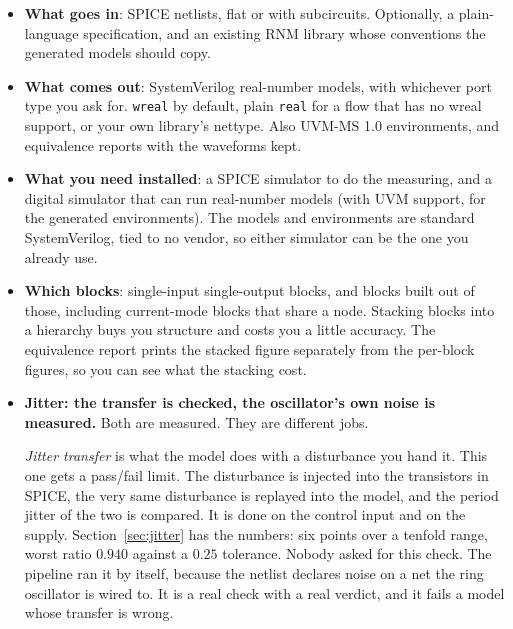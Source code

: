 \documentclass[11pt,a4paper]{article}
\begin{document}
\begin{itemize}[leftmargin=1.5em,itemsep=0.3em]
  \item \textbf{What goes in}: SPICE netlists, flat or with subcircuits.
        Optionally, a plain-language specification, and an existing RNM
        library whose conventions the generated models should copy.
  \item \textbf{What comes out}: SystemVerilog real-number models, with
        whichever port type you ask for. \texttt{wreal} by default,
        plain \texttt{real} for a flow that has no wreal support, or
        your own library's nettype. Also UVM-MS 1.0 environments, and
        equivalence reports with the waveforms kept.
  \item \textbf{What you need installed}: a SPICE simulator to do the
        measuring, and a digital simulator that can run real-number
        models (with UVM support, for the generated environments). The
        models and environments are standard SystemVerilog, tied to no
        vendor, so either simulator can be the one you already use.
  \item \textbf{Which blocks}: single-input single-output blocks, and
        blocks built out of those, including current-mode blocks that
        share a node. Stacking blocks into a hierarchy buys you
        structure and costs you a little accuracy. The equivalence
        report prints the stacked figure separately from the per-block
        figures, so you can see what the stacking cost.
  \item \textbf{Jitter: the transfer is checked, the oscillator's own
        noise is measured.} Both are measured. They are different jobs.

        \emph{Jitter transfer} is what the model does with a
        disturbance you hand it. This one gets a pass/fail limit. The
        disturbance is injected into the transistors in SPICE, the
        very same disturbance is replayed into the model, and the
        period jitter of the two is compared. It is done on the
        control input and on the supply. Section~\ref{sec:jitter} has
        the numbers: six points over a tenfold range, worst ratio
        $0.940$ against a $0.25$ tolerance. Nobody asked for this
        check. The pipeline ran it by itself, because the netlist
        declares noise on a net the ring oscillator is wired to. It is
        a real check with a real verdict, and it fails a model whose
        transfer is wrong.


\end{itemize}
\end{document}
